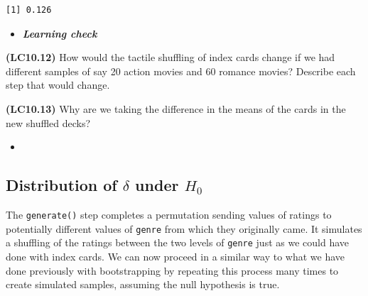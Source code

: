 \documentclass[12pt,]{krantz}
\makeatletter
\newenvironment{Shaded}{\begin{snugshade}}{\end{snugshade}}
\newcommand{\KeywordTok}[1]{\textcolor[rgb]{0.27,0.27,0.27}{\textbf{#1}}}
\newcommand{\DataTypeTok}[1]{\textcolor[rgb]{0.27,0.27,0.27}{#1}}
\newcommand{\DecValTok}[1]{\textcolor[rgb]{0.06,0.06,0.06}{#1}}
\newcommand{\StringTok}[1]{\textcolor[rgb]{0.5,0.5,0.5}{#1}}
\newcommand{\OperatorTok}[1]{\textcolor[rgb]{0.43,0.43,0.43}{\textbf{#1}}}
\newcommand{\NormalTok}[1]{#1}
\newenvironment{kframe}{%
\medskip{}
\setlength{\fboxsep}{.8em}
 \def\at@end@of@kframe{}%
 \ifinner\ifhmode%
  \def\at@end@of@kframe{\end{minipage}}%
  \begin{minipage}{\columnwidth}%
 \fi\fi%
 \def\FrameCommand##1{\hskip\@totalleftmargin \hskip-\fboxsep
 \colorbox{shadecolor}{##1}\hskip-\fboxsep
     \hskip-\linewidth \hskip-\@totalleftmargin \hskip\columnwidth}%
 \MakeFramed {\advance\hsize-\width
   \@totalleftmargin\z@ \linewidth\hsize
   \@setminipage}}%
 {\par\unskip\endMakeFramed%
 \at@end@of@kframe}
\renewenvironment{Shaded}{\begin{kframe}}{\end{kframe}}
\newenvironment{rmdblock}[1]
  {\begin{shaded*}
  \begin{itemize}
  \renewcommand{\labelitemi}{
    \raisebox{-.7\height}[0pt][0pt]{
    }
  }
  \item
  }
  {
  \end{itemize}
  \end{shaded*}
  }
\newenvironment{learncheck}
  {\begin{rmdblock}{warning}}
  {\end{rmdblock}}
\theoremstyle{definition}
\theoremstyle{definition}
\theoremstyle{definition}
\theoremstyle{remark}
\makeatother
\begin{document}
\begin{verbatim}
[1] 0.126
\end{verbatim}

\begin{Shaded}
\end{Shaded}

\begin{learncheck}
\textbf{\emph{Learning check}}
\end{learncheck}

\textbf{(LC10.12)} How would the tactile shuffling of index cards change
if we had different samples of say 20 action movies and 60 romance
movies? Describe each step that would change.

\textbf{(LC10.13)} Why are we taking the difference in the means of the
cards in the new shuffled decks?

\begin{learncheck}

\end{learncheck}

\subsection{\texorpdfstring{Distribution of \(\delta\) under
\(H_0\)}{Distribution of \textbackslash{}delta under H\_0}}\label{distribution-of-delta-under-h_0}

The \texttt{generate()} step completes a permutation sending values of
ratings to potentially different values of \texttt{genre} from which
they originally came. It simulates a shuffling of the ratings between
the two levels of \texttt{genre} just as we could have done with index
cards. We can now proceed in a similar way to what we have done
previously with bootstrapping by repeating this process many times to
create simulated samples, assuming the null hypothesis is true.

\begin{Shaded}
\end{Shaded}
\end{document}
